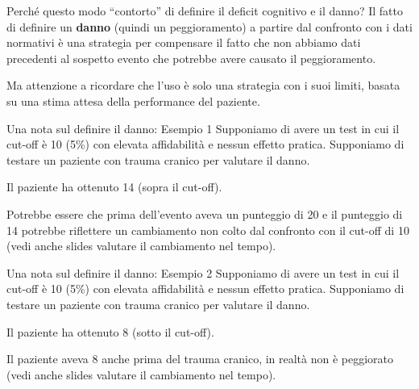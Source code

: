 \documentclass[
  ignorenonframetext,
]{beamer}
\begin{document}
\begin{frame}{Perché questo modo ``contorto'' di definire il deficit
cognitivo e il danno?}
\label{perchuxe9-questo-modo-contorto-di-definire-il-deficit-cognitivo-e-il-danno-4}
Il fatto di definire un \textbf{danno} (quindi un peggioramento) a
partire dal confronto con i dati normativi è una strategia per
compensare il fatto che non abbiamo dati precedenti al sospetto evento
che potrebbe avere causato il peggioramento.

Ma attenzione a ricordare che l'uso è solo una strategia con i suoi
limiti, basata su una stima attesa della performance del paziente.
\end{frame}

\begin{frame}{Una nota sul definire il danno: Esempio 1}
\label{una-nota-sul-definire-il-danno-esempio-1}
Supponiamo di avere un test in cui il cut-off è 10 (5\%) con elevata
affidabilità e nessun effetto pratica. Supponiamo di testare un paziente
con trauma cranico per valutare il danno.

Il paziente ha ottenuto 14 (sopra il cut-off).

Potrebbe essere che prima dell'evento aveva un punteggio di 20 e il
punteggio di 14 potrebbe riflettere un cambiamento non colto dal
confronto con il cut-off di 10 (vedi anche slides valutare il
cambiamento nel tempo).
\end{frame}

\begin{frame}{Una nota sul definire il danno: Esempio 2}
\label{una-nota-sul-definire-il-danno-esempio-2}
Supponiamo di avere un test in cui il cut-off è 10 (5\%) con elevata
affidabilità e nessun effetto pratica. Supponiamo di testare un paziente
con trauma cranico per valutare il danno.

Il paziente ha ottenuto 8 (sotto il cut-off).

Il paziente aveva 8 anche prima del trauma cranico, in realtà non è
peggiorato (vedi anche slides valutare il cambiamento nel tempo).
\end{frame}
\end{document}
